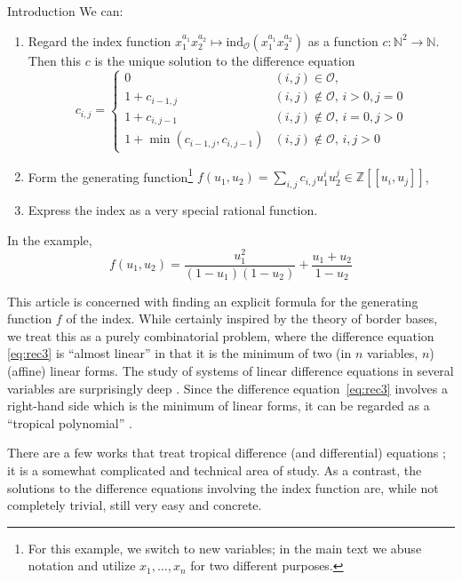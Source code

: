 \documentclass[reqno,a4paper,10pt]{amsart}
\theoremstyle{definition}
\theoremstyle{remark}
\theoremstyle{plain}
\newcommand{\Nat}{{\mathbb{N}}}
\newcommand{\Z}{{\mathbb{Z}}}
\newcommand{\ind}{\mathrm{ind}}
\begin{document}
\begin{section}{Introduction}
    We can:
    \begin{enumerate}
      \item Regard the index function
            \(x_{1}^{a_{1}}x_{2}^{a_{2}} \mapsto \ind_{\mathcal{O}}(x_{1}^{a_{1}}x_{2}^{a_{2}})\)
            as a function \(c: \Nat^{2} \to \Nat\).
            Then this \(c\) is the unique solution to the difference equation
            \begin{equation}
      \label{eq:rec3}
      c_{i,j} =
        \begin{cases}
          0 & (i,j) \in \mathcal{O}, \\
          1 + c_{i-1,j} & (i,j) \not \in \mathcal{O}, \, i>0, j=0 \\
          1 + c_{i,j-1} & (i,j) \not \in \mathcal{O}, \, i=0, j>0 \\
          1 + \min(c_{i-1,j}, c_{i,j-1}) &  (i,j) \not \in \mathcal{O}, \, i,j > 0
        \end{cases}
    \end{equation}

      \item Form the generating function\footnote{For this example, we switch to new variables; in
            the main text we abuse notation and utilize \(x_{1},\dots,x_{n}\) for two different
            purposes.}
            \(f(u_{1},u_{2})=\sum_{i,j} c_{{i,j}}u_{1}^{i}u_{2}^{j} \in \Z[[u_{i},u_{j}]]\),
    \item
      Express the index as a very special rational function.
    \end{enumerate}
    In the example,
    \begin{displaymath}
      f(u_{1},u_{2}) = \frac{u_1^{2}}{(1-u_{1})(1-u_{2})}
      + \frac{u_{1} + u_{2}}{1-u_{2}}
    \end{displaymath}

    This article is concerned with finding an explicit formula for the generating function
    \(f\) of the index. While certainly inspired by the theory of border bases, we treat this as a
    purely combinatorial problem, where the difference equation \eqref{eq:rec3} is ``almost linear''
    in that it is the minimum of two (in \(n\) variables, \(n\)) (affine) linear forms.
    The study of systems of linear difference equations in several variables are surprisingly deep
    \cite{bousquet2006polynomial,
      bousquet2005walks,
      bousquet2003walks,
      bousquet2010families,
      prea1997exterior,
      flajolet2009analytic}.
    Since the difference equation~\eqref{eq:rec3} involves a right-hand side which is the minimum
    of linear forms, it can be regarded as a ``tropical polynomial''
    \cite{speyer2009tropical,mikhalkin2009tropical}.

    There are a few works that treat tropical difference (and differential) equations
    \cite{grigoriev2017tropical,giansiracusa2024general}; it is a somewhat complicated and technical
    area of study. As a contrast, the solutions to the difference equations involving the index function
    are, while not completely trivial, still very easy and concrete.



\end{section}
\end{document}
